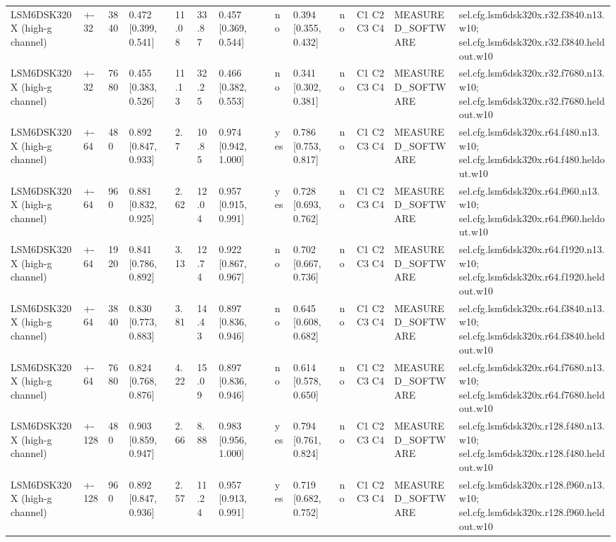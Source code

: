 \begin{table}[t]
\begin{tabular}{llllllllllllll}
LSM6DSK320X (high-g channel) & +-32 & 3840 & 0.472 [0.399, 0.541] & 11.08 & 33.87 & 0.457 [0.369, 0.544] &  & no & 0.394 [0.355, 0.432] & no & C1 C2 C3 C4 & MEASURED\_SOFTWARE & sel.cfg.lsm6dsk320x.r32.f3840.n13.w10; sel.cfg.lsm6dsk320x.r32.f3840.heldout.w10 \\
LSM6DSK320X (high-g channel) & +-32 & 7680 & 0.455 [0.383, 0.526] & 11.13 & 32.25 & 0.466 [0.382, 0.553] &  & no & 0.341 [0.302, 0.381] & no & C1 C2 C3 C4 & MEASURED\_SOFTWARE & sel.cfg.lsm6dsk320x.r32.f7680.n13.w10; sel.cfg.lsm6dsk320x.r32.f7680.heldout.w10 \\
LSM6DSK320X (high-g channel) & +-64 & 480 & 0.892 [0.847, 0.933] & 2.7 & 10.85 & 0.974 [0.942, 1.000] &  & yes & 0.786 [0.753, 0.817] & no & C1 C2 C3 C4 & MEASURED\_SOFTWARE & sel.cfg.lsm6dsk320x.r64.f480.n13.w10; sel.cfg.lsm6dsk320x.r64.f480.heldout.w10 \\
LSM6DSK320X (high-g channel) & +-64 & 960 & 0.881 [0.832, 0.925] & 2.62 & 12.04 & 0.957 [0.915, 0.991] &  & yes & 0.728 [0.693, 0.762] & no & C1 C2 C3 C4 & MEASURED\_SOFTWARE & sel.cfg.lsm6dsk320x.r64.f960.n13.w10; sel.cfg.lsm6dsk320x.r64.f960.heldout.w10 \\
LSM6DSK320X (high-g channel) & +-64 & 1920 & 0.841 [0.786, 0.892] & 3.13 & 12.74 & 0.922 [0.867, 0.967] &  & no & 0.702 [0.667, 0.736] & no & C1 C2 C3 C4 & MEASURED\_SOFTWARE & sel.cfg.lsm6dsk320x.r64.f1920.n13.w10; sel.cfg.lsm6dsk320x.r64.f1920.heldout.w10 \\
LSM6DSK320X (high-g channel) & +-64 & 3840 & 0.830 [0.773, 0.883] & 3.81 & 14.43 & 0.897 [0.836, 0.946] &  & no & 0.645 [0.608, 0.682] & no & C1 C2 C3 C4 & MEASURED\_SOFTWARE & sel.cfg.lsm6dsk320x.r64.f3840.n13.w10; sel.cfg.lsm6dsk320x.r64.f3840.heldout.w10 \\
LSM6DSK320X (high-g channel) & +-64 & 7680 & 0.824 [0.768, 0.876] & 4.22 & 15.09 & 0.897 [0.836, 0.946] &  & no & 0.614 [0.578, 0.650] & no & C1 C2 C3 C4 & MEASURED\_SOFTWARE & sel.cfg.lsm6dsk320x.r64.f7680.n13.w10; sel.cfg.lsm6dsk320x.r64.f7680.heldout.w10 \\
LSM6DSK320X (high-g channel) & +-128 & 480 & 0.903 [0.859, 0.947] & 2.66 & 8.88 & 0.983 [0.956, 1.000] &  & yes & 0.794 [0.761, 0.824] & no & C1 C2 C3 C4 & MEASURED\_SOFTWARE & sel.cfg.lsm6dsk320x.r128.f480.n13.w10; sel.cfg.lsm6dsk320x.r128.f480.heldout.w10 \\
LSM6DSK320X (high-g channel) & +-128 & 960 & 0.892 [0.847, 0.936] & 2.57 & 11.24 & 0.957 [0.913, 0.991] &  & yes & 0.719 [0.682, 0.752] & no & C1 C2 C3 C4 & MEASURED\_SOFTWARE & sel.cfg.lsm6dsk320x.r128.f960.n13.w10; sel.cfg.lsm6dsk320x.r128.f960.heldout.w10 \\

\end{tabular}
\end{table}
